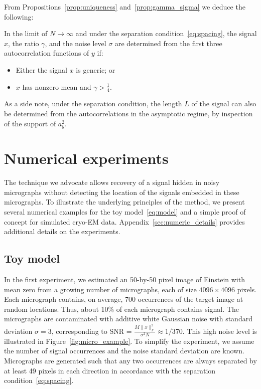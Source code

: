 \documentclass[9pt,twocolumn,twoside,lineno]{pnas-new}
\begin{document}
From Propositions~\ref{prop:uniqueness} and~\ref{prop:gamma_sigma} we   deduce the following:
\begin{corollary}
	 In the limit of $N\to \infty$ and under the separation condition~\eqref{eq:spacing}, the signal $x$, the ratio $\gamma$, and the noise level $\sigma$ are determined from the first three autocorrelation functions of $y$ if:
	\begin{itemize}
		\item Either the signal $x$ is generic; or
		\item   $x$ has nonzero mean  and $\gamma > \frac{1}{4}$.
	\end{itemize}
\end{corollary}
%

As a side note, under the separation condition, the length $L$ of the signal can also be determined from the autocorrelations in the asymptotic regime, by inspection of the support of $a_y^2$.


\section{Numerical experiments}

The technique we advocate allows recovery of a signal hidden in noisy micrographs without detecting the location  of the signals embedded in these micrographs. To illustrate the underlying principles of the method, we present several numerical examples for the toy model~\eqref{eq:model} and a simple proof of concept for simulated cryo-EM data.  Appendix~\ref{sec:numeric_details} provides additional details on the experiments. 

\subsection{Toy model}
In the first experiment, we estimated 
an 50-by-50 pixel image of Einstein with mean zero from a growing number of micrographs, each of size $4096\times 4096$ pixels. Each micrograph contains, on average, 700 occurrences of the target image at random locations. 
Thus, about 10\% of each micrograph contains signal. The micrographs are contaminated with additive white Gaussian noise with standard deviation $\sigma=3$,  corresponding  to SNR = $\frac{M\|x\|_F^2} {\sigma^2N} \approx1/370$. This high noise level is illustrated in Figure~\ref{fig:micro_example}. 
To simplify the experiment, we assume the number of signal occurrences and the noise standard deviation are known. Micrographs are generated such that any two occurrences are always separated by at least 49 pixels in each direction in accordance with the separation condition~\eqref{eq:spacing}. 
\end{document}
